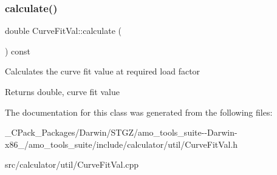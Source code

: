 \subsubsection{\texorpdfstring{calculate()}{calculate()}\hspace{0.1cm}{\footnotesize\ttfamily [3/3]}}
{\footnotesize\ttfamily double Curve\+Fit\+Val\+::calculate (\begin{DoxyParamCaption}{ }\end{DoxyParamCaption}) const}

Calculates the curve fit value at required load factor \begin{DoxyReturn}{Returns}
double, curve fit value 
\end{DoxyReturn}


The documentation for this class was generated from the following files\+:\begin{DoxyCompactItemize}
\item 
\+\_\+\+C\+Pack\+\_\+\+Packages/\+Darwin/\+S\+T\+G\+Z/amo\+\_\+tools\+\_\+suite-\/-\/\+Darwin-\/x86\+\_/amo\+\_\+tools\+\_\+suite/include/calculator/util/Curve\+Fit\+Val.\+h\item 
src/calculator/util/Curve\+Fit\+Val.\+cpp\end{DoxyCompactItemize}

